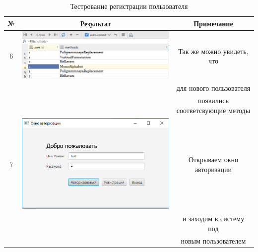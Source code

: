 \documentclass[a4paper,12pt]{article}
\begin{document}
\begin{table}[pt!]
	\caption{Тестрование регистрации пользователя}
	\centering
	\begin{tabular}{|c|c|c|}
	\hline 
	№  & Результат & Примечание \\ 
	\hline 
	6 & \includegraphics[scale=0.3]{img/database/after_registry_methods.png} & Так же можно увидеть, что \\ && для нового пользователя \\ && появились соответсвующие методы\\
	\hline 
	7 & \includegraphics[scale=0.3]{img/database/authorization.png} & Открываем окно авторизации \\ && и заходим в систему под \\ && новым пользователем\\
	\hline 

\end{tabular}
\end{table}
\end{document}
